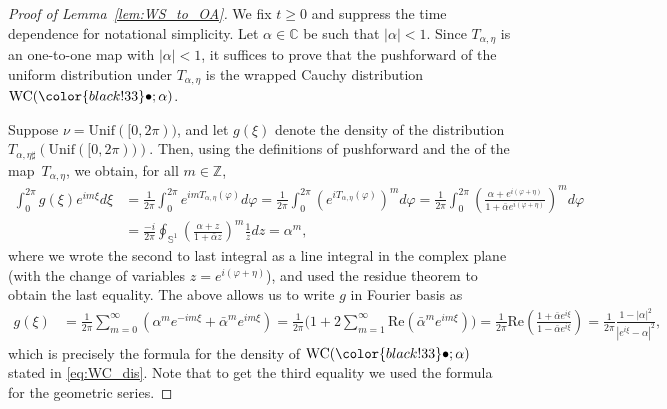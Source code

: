 \documentclass[10pt]{article}
\theoremstyle{definition}
\theoremstyle{definition}
\numberwithin{equation}{section}
\newcommand{\C}{\mathbb{C}}
\renewcommand{\S}{\mathbb{S}}
\newcommand{\dummy}{\mathord{\color{black!33}\bullet}}
\newcommand{\WC}{\mathrm{WC}}
\begin{document}
\begin{proof}[Proof of Lemma~\ref{lem:WS_to_OA}]
We fix $t \geq 0$ and suppress the time dependence for notational simplicity.
Let $\alpha \in \C $ be such that $|\alpha|<1$.
Since $T_{\alpha, \eta}$ is an one-to-one map with $|\alpha| < 1$, it suffices to prove that the pushforward of the uniform distribution under $T_{\alpha,\eta}$ is the wrapped Cauchy distribution $\WC(\dummy;\alpha)$. 

Suppose $\nu = \mathrm{Unif}([0,2\pi))$, and let $g(\xi)$ denote the density of the distribution $T_{\alpha, \eta \sharp} \left(\mathrm{Unif}([0,2\pi)) \right)$.
Then, using the definitions of pushforward and
the of the map~$T_{\alpha, \eta}$, we obtain, for all $m \in \mathbb{Z}$,
\begin{equation*}
\begin{split}
    \int_{0}^{2\pi} g(\xi) e^{im \xi} d\xi
    &= \frac{1}{2\pi}\int_0^{2\pi} e^{im T_{\alpha, \eta}(\varphi)} d \varphi
    = \frac{1}{2\pi}\int_0^{2\pi} (e^{i T_{\alpha, \eta}(\varphi)})^m d \varphi
    =\frac{1}{2\pi}\int_0^{2\pi} \left( \frac{\alpha + e^{i(\varphi + \eta)}}{1 + \bar{\alpha} e^{i( \varphi + \eta)}} \right)^m d \varphi \\
    &= \frac{-i}{2\pi} \oint_{\S^1} \left( \frac{\alpha + z}{1 + \bar{\alpha} z} \right)^m \frac{1}{z} d z
    = \alpha^m,
\end{split}  
\end{equation*}
where we wrote the second to last integral as a line integral in the complex plane (with the change of variables $z=e^{i(\varphi + \eta)}$), and used the residue theorem to obtain the last equality. The above allows us to write $g$ in Fourier basis as
\begin{equation*}
\begin{split}
    g(\xi)
    & = \frac{1}{2\pi} \sum_{m=0}^{\infty} \left(\alpha^m e^{-im\xi}  + \bar{\alpha}^m e^{i m \xi }\right)
    = \frac{1}{2\pi} \bigg( 1+ 2\sum_{m=1}^\infty \mathrm{Re}\left( \bar{\alpha}^m e^{im\xi} \right)  \bigg) 
    = \frac{1}{2\pi} \mathrm{Re}\left( \frac{1+ \bar{\alpha} e^{i \xi} }{1-\bar{\alpha}e^{i\xi} } \right) = \frac{1}{2\pi} \frac{1 - |\alpha|^2}{|e^{i\xi} - \alpha|^2},
\end{split}
\end{equation*}
which is precisely the formula for the density of $\WC(\dummy; \alpha)$ stated in \eqref{eq:WC_dis}.
Note that to get the third equality we used the formula for the geometric series.
\end{proof}
\end{document}
